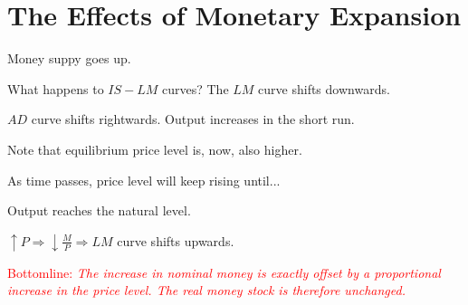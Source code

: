 \documentclass[shownotes,11pt, aspectratio=169]{beamer}
\newenvironment{wideitemize}{\itemize\addtolength{\itemsep}{10pt}}{\enditemize}
\begin{document}
\section{The Effects of Monetary Expansion}
\begin{frame}
\textcolor{ao(english)}{Money suppy goes up.}
\begin{wideitemize}
\item What happens to $IS-LM$ curves? \pause The $LM$ curve shifts downwards. \pause
\item $AD$ curve shifts rightwards. \pause Output increases in the short run. \pause
\item Note that equilibrium price level is, now, also higher.
\item As time passes, price level will keep rising until...\pause
\item Output reaches the natural level.
\pause
\item $\uparrow P \Rightarrow \downarrow \frac{M}{P} \Rightarrow LM$ curve shifts upwards.
\end{wideitemize}
\vspace{2mm}

\textcolor{red}{Bottomline: \textit{The increase in nominal money is exactly offset by a proportional increase in the price level. The real money stock is therefore unchanged.}}
\end{frame}

\begin{frame}
\end{frame}
\end{document}
